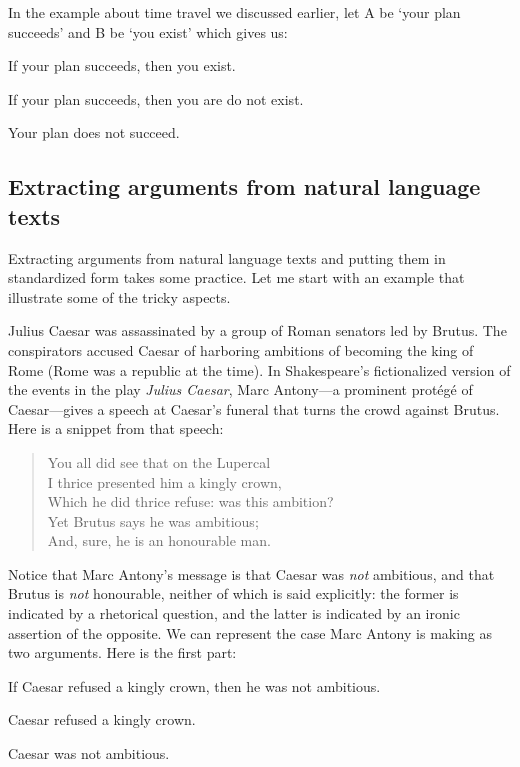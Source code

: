 In the example about time travel we discussed earlier, let A be `your plan 
succeeds' and B be `you exist' which gives us:

\begin{argumentNamed*}[Argument 3]

 \aitem If your plan succeeds, then you exist.

 \aitem If your plan succeeds, then you are do not exist.

 \aitem Your plan does not succeed.

\end{argumentNamed*}


\subsection{Extracting arguments from natural language texts}

Extracting arguments from natural language texts and putting them in 
standardized form takes some practice. Let me start with an example that 
illustrate some of the tricky aspects.

Julius Caesar was assassinated by a group of Roman senators led by Brutus. The 
conspirators accused Caesar of harboring ambitions of becoming the king of Rome 
(Rome was a republic at the time). In Shakespeare's fictionalized version of the 
events in the play \emph{Julius Caesar}, Marc Antony---a prominent prot\'eg\'e 
of Caesar---gives a speech at Caesar's funeral that turns the crowd against 
Brutus.  Here is a snippet from that speech:

\begin{quote}
You all did see that on the Lupercal\\
I thrice presented him a kingly crown,\\
Which he did thrice refuse: was this ambition?\\
Yet Brutus says he was ambitious;\\
And, sure, he is an honourable man.
\end{quote}

Notice that Marc Antony's message is that Caesar was \emph{not} ambitious, and 
that Brutus is \emph{not} honourable, neither of which is said explicitly: the 
former is indicated by a rhetorical question, and the latter is indicated by an 
ironic assertion of the opposite. We can represent the case Marc Antony is 
making as two arguments.  Here is the first part:
 \begin{argument*}

  \aitem If Caesar refused a kingly crown, then he was not 
  ambitious.

  \aitem Caesar refused a kingly crown.

  \aitem Caesar was not ambitious.

 \end{argument*}

